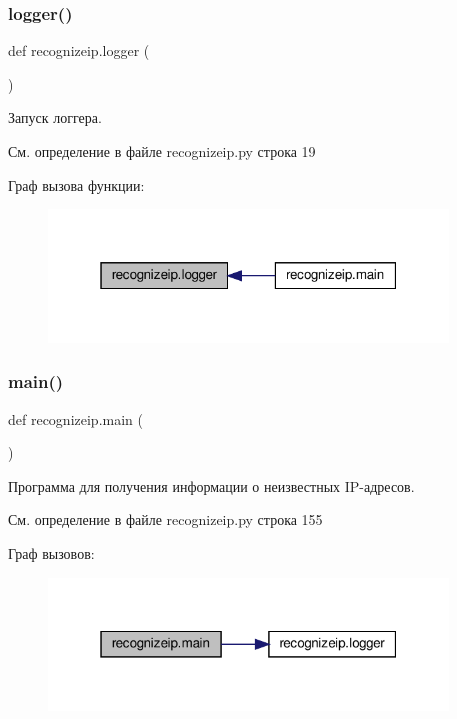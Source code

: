 \subsubsection{\texorpdfstring{logger()}{logger()}}
{\footnotesize\ttfamily def recognizeip.\+logger (\begin{DoxyParamCaption}{ }\end{DoxyParamCaption})}



Запуск логгера. 



См. определение в файле recognizeip.\+py строка 19

Граф вызова функции\+:\nopagebreak
\begin{figure}[H]
\begin{center}
\leavevmode
\includegraphics[width=301pt]{namespacerecognizeip_a99d8f7a73addea7cea8ad5b0225e5005_icgraph}
\end{center}
\end{figure}
\mbox{\label{namespacerecognizeip_aeacb92c088c1e5c9894254e390bc52c2}} 
\subsubsection{\texorpdfstring{main()}{main()}}
{\footnotesize\ttfamily def recognizeip.\+main (\begin{DoxyParamCaption}{ }\end{DoxyParamCaption})}



Программа для получения информации о неизвестных I\+P-\/адресов. 



См. определение в файле recognizeip.\+py строка 155

Граф вызовов\+:\nopagebreak
\begin{figure}[H]
\begin{center}
\leavevmode
\includegraphics[width=301pt]{namespacerecognizeip_aeacb92c088c1e5c9894254e390bc52c2_cgraph}
\end{center}
\end{figure}
\mbox{\label{namespacerecognizeip_ad9b913f5fd7d2c429fb56302952d3d74}} 

